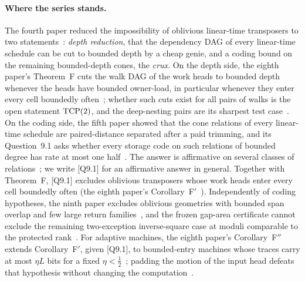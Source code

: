 \paragraph{Where the series stands.} The fourth paper reduced the impossibility of oblivious linear-time transposers to
two statements~\cite{FourthPaper2026}: \emph{depth reduction}, that the dependency DAG of every linear-time schedule can
be cut to bounded depth by a cheap genie, and a coding bound on the remaining bounded-depth cones, the \emph{crux}. On the
depth side, the eighth paper's Theorem~F cuts the walk DAG of the work heads to bounded depth whenever the heads have
bounded owner-load, in particular whenever they enter every cell boundedly
often~\cite[Theorem~3.6 and Corollary~3.2]{BoundedNesting2026}; whether such cuts exist for all pairs of walks is the open statement
$\mathrm{TCP}(2)$, and the deep-nesting pairs are its sharpest test case~\cite{BoundedNesting2026,DirectedReciprocity2026}. On the
coding side, the fifth paper showed that the cone relations of every linear-time schedule are paired-distance separated
after a paid trimming, and its Question~9.1 asks whether every storage code on such relations of bounded degree has rate
at most one half~\cite{DirectedRecovery2026}. The answer is affirmative on several classes of
relations~\cite{DirectedRecovery2026,SeventhPaper2026,DirectedReciprocity2026}; we write [Q9.1] for an affirmative answer in
general. Together with Theorem~F, [Q9.1] excludes oblivious transposers whose work heads enter every cell boundedly often
(the eighth paper's Corollary~F$'$~\cite[Corollary~6.3]{BoundedNesting2026}). Independently of coding hypotheses, the
ninth paper excludes oblivious geometries with bounded span overlap and few large return families~\cite{SourceCovers2026},
and the frozen gap-area certificate cannot exclude the remaining two-exception inverse-square case at moduli comparable to
the protected rank~\cite{GapAreaMemo2026}. For adaptive machines, the eighth paper's Corollary~F$''$ extends Corollary~F$'$,
given [Q9.1], to bounded-entry machines whose traces carry at most $\eta L$ bits for a fixed
$\eta<\frac12$~\cite[Corollary~6.4]{BoundedNesting2026}; padding the motion of the input head defeats that
hypothesis without changing the computation~\cite[Section~6.2]{BoundedNesting2026}.

